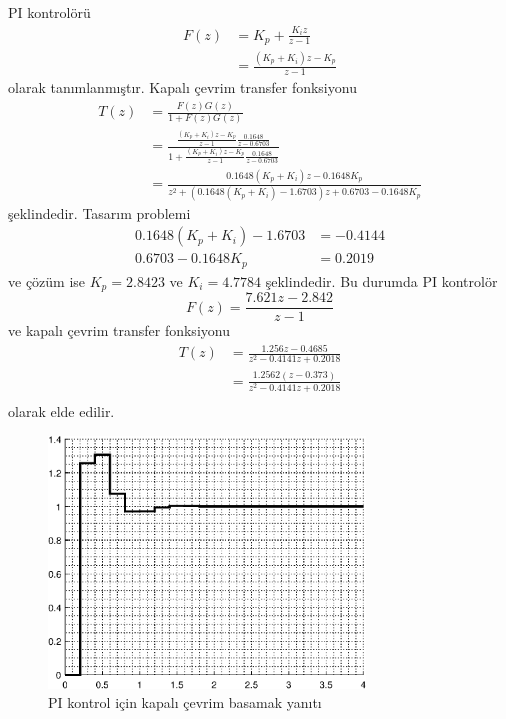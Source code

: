 PI kontrolörü 
\begin{equation}
\begin{split}
    F(z)&=K_p+\frac{K_iz}{z-1}\\
    &=\frac{(K_p+K_i)z-K_p}{z-1}
\end{split}
\end{equation}
olarak tanımlanmıştır. Kapalı çevrim transfer fonksiyonu 
\begin{equation}
    \begin{split}
        T(z)&=\frac{F(z)G(z)}{1+F(z)G(z)}\\
        &=\frac{\frac{(K_p+K_i)z-K_p}{z-1}\frac{0.1648}{z-0.6703}}{1+\frac{(K_p+K_i)z-K_p}{z-1}\frac{0.1648}{z-0.6703}}\\
        &=\frac{0.1648(K_p+K_i)z-0.1648K_p}{z^2+(0.1648(K_p+K_i)-1.6703)z+0.6703-0.1648K_p}
    \end{split}
\end{equation}
şeklindedir. Tasarım problemi
\begin{equation}
    \begin{split}
       0.1648(K_p+K_i)-1.6703&=-0.4144\\
       0.6703-0.1648K_p&=0.2019
    \end{split}
\end{equation}
ve çözüm ise $K_p=2.8423$ ve $K_i=4.7784$ şeklindedir. Bu durumda PI kontrolör
\begin{equation}
        F(z)=\frac{7.621 z - 2.842}{z-1}
\end{equation}
ve kapalı çevrim transfer fonksiyonu
\begin{equation}
\begin{split}
    T(z)&=\frac{1.256 z - 0.4685}{z^2 - 0.4141 z + 0.2018}\\
    &=\frac{1.2562 (z-0.373)}{z^2 - 0.4141 z + 0.2018}\\
\end{split}
\end{equation}
olarak elde edilir.

\begin{figure}[!htb]
    \centering
    \includegraphics[width=0.75\textwidth]{img/lec6_step3}
    \caption{PI kontrol için kapalı çevrim basamak yanıtı}
    \label{fig:lec6_step3}
\end{figure}